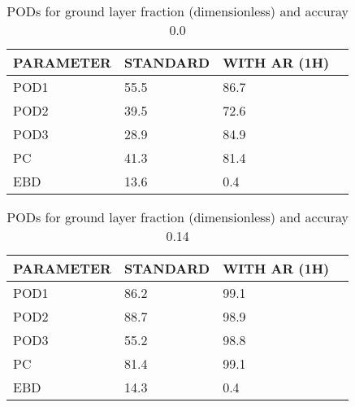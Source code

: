 \documentclass[11pt,english]{article}
\begin{document}
\begin{table}[]
\begin{center}
\begin{tabular}{|l|l|l|l|}
\hline
\multicolumn{1}{|c|}{\cellcolor[HTML]{C0C0C0}\textbf{PARAMETER}} & \multicolumn{1}{c|}{\cellcolor[HTML]{C0C0C0}\textbf{STANDARD}} & \multicolumn{1}{c|}{\cellcolor[HTML]{C0C0C0}\textbf{WITH AR (1H)}} \\
\hline
\cellcolor[HTML]{C0C0C0}POD1  & 55.5                                & 86.7         \\
\cellcolor[HTML]{C0C0C0}POD2  & 39.5                                & 72.6         \\
\cellcolor[HTML]{C0C0C0}POD3  & 28.9                                & 84.9         \\
\cellcolor[HTML]{C0C0C0}PC    & 41.3                                  & 81.4           \\
\cellcolor[HTML]{C0C0C0}EBD   & 13.6                                 & 0.4          \\
\hline
\end{tabular}
\caption{PODs for ground layer fraction (dimensionless) and accuray 0.0}
\end{center}
\end{table}
\begin{table}[]
\begin{center}
\begin{tabular}{|l|l|l|l|}
\hline
\multicolumn{1}{|c|}{\cellcolor[HTML]{C0C0C0}\textbf{PARAMETER}} & \multicolumn{1}{c|}{\cellcolor[HTML]{C0C0C0}\textbf{STANDARD}} & \multicolumn{1}{c|}{\cellcolor[HTML]{C0C0C0}\textbf{WITH AR (1H)}} \\
\hline
\cellcolor[HTML]{C0C0C0}POD1  & 86.2                                & 99.1         \\
\cellcolor[HTML]{C0C0C0}POD2  & 88.7                                & 98.9         \\
\cellcolor[HTML]{C0C0C0}POD3  & 55.2                                & 98.8         \\
\cellcolor[HTML]{C0C0C0}PC    & 81.4                                  & 99.1           \\
\cellcolor[HTML]{C0C0C0}EBD   & 14.3                                 & 0.4          \\
\hline
\end{tabular}
\caption{PODs for ground layer fraction (dimensionless) and accuray 0.14}
\end{center}
\end{table}
\end{document}
